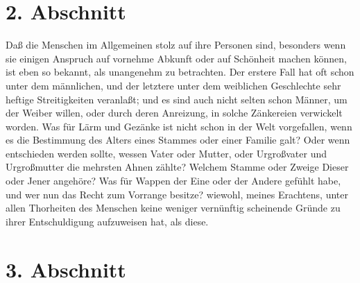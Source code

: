 \section{2. Abschnitt} \label{kap11_ab2}

Daß die Menschen im Allgemeinen stolz auf ihre Personen sind, besonders wenn sie
einigen Anspruch auf vornehme Abkunft oder auf
Schönheit machen können, ist eben
so bekannt, als unangenehm zu betrachten. Der erstere Fall hat oft schon unter
dem männlichen, und der letztere unter dem weiblichen Geschlechte sehr heftige
Streitigkeiten veranlaßt; und es sind auch nicht selten schon Männer, um der
Weiber willen, oder durch deren Anreizung, in solche Zänkereien verwickelt
worden. Was für Lärm und Gezänke ist nicht schon in der Welt vorgefallen, wenn
es die Bestimmung des Alters eines Stammes oder einer Familie galt? Oder wenn
entschieden werden sollte, wessen Vater oder Mutter, oder Urgroßvater und
Urgroßmutter die mehrsten Ahnen zählte? Welchem Stamme oder Zweige Dieser oder
Jener angehöre? Was für Wappen der Eine oder der Andere gefühlt
habe, und wer
nun das Recht zum Vorrange besitze? wiewohl, meines Erachtens, unter allen
Thorheiten des Menschen keine weniger vernünftig scheinende Gründe zu ihrer
Entschuldigung aufzuweisen hat, als diese.

\section{3. Abschnitt} \label{kap11_ab3}

